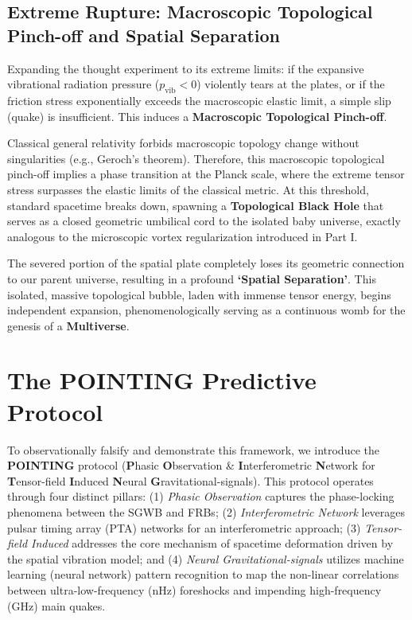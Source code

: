 \documentclass[reprint,amsmath,amssymb,aps,prd]{revtex4-2}
\begin{document}
\subsection{Extreme Rupture: Macroscopic Topological Pinch-off and Spatial Separation}
Expanding the thought experiment to its extreme limits: if the expansive vibrational radiation pressure ($p_{\mathrm{vib}} < 0$) violently tears at the plates, or if the friction stress exponentially exceeds the macroscopic elastic limit, a simple slip (quake) is insufficient.
This induces a \textbf{Macroscopic Topological Pinch-off}.

Classical general relativity forbids macroscopic topology change without singularities (e.g., Geroch's theorem).
Therefore, this macroscopic topological pinch-off implies a phase transition at the Planck scale, where the extreme tensor stress surpasses the elastic limits of the classical metric.
At this threshold, standard spacetime breaks down, spawning a \textbf{Topological Black Hole} that serves as a closed geometric umbilical cord to the isolated baby universe, exactly analogous to the microscopic vortex regularization introduced in Part I.

The severed portion of the spatial plate completely loses its geometric connection to our parent universe, resulting in a profound \textbf{`Spatial Separation'}.
This isolated, massive topological bubble, laden with immense tensor energy, begins independent expansion, phenomenologically serving as a continuous womb for the genesis of a \textbf{Multiverse}.

\section{The POINTING Predictive Protocol}
To observationally falsify and demonstrate this framework, we introduce the \textbf{POINTING} protocol (\textbf{P}hasic \textbf{O}bservation \& \textbf{I}nterferometric \textbf{N}etwork for \textbf{T}ensor-field \textbf{I}nduced \textbf{N}eural \textbf{G}ravitational-signals).
This protocol operates through four distinct pillars: (1) \textit{Phasic Observation} captures the phase-locking phenomena between the SGWB and FRBs;
(2) \textit{Interferometric Network} leverages pulsar timing array (PTA) networks \cite{Agazie2023} for an interferometric approach;
(3) \textit{Tensor-field Induced} addresses the core mechanism of spacetime deformation driven by the spatial vibration model;
and (4) \textit{Neural Gravitational-signals} utilizes machine learning (neural network) pattern recognition to map the non-linear correlations between ultra-low-frequency (nHz) foreshocks and impending high-frequency (GHz) main quakes.
\end{document}
